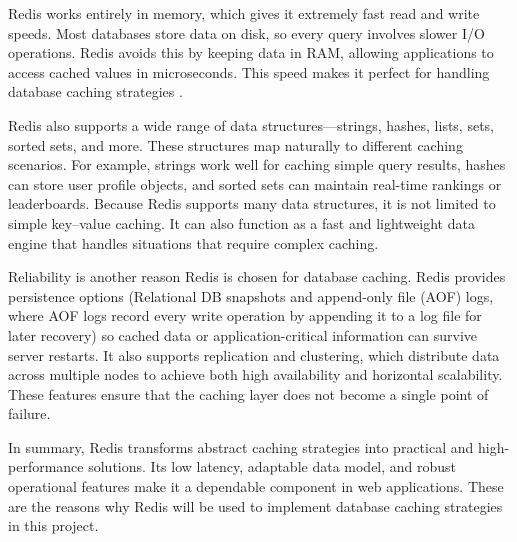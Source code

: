 Redis works entirely in memory, which gives it extremely fast read and write speeds.
Most databases store data on disk, so every query involves slower I/O operations.
Redis avoids this by keeping data in RAM, allowing applications to access cached values in microseconds.
This speed makes it perfect for handling database caching strategies \cite{Carlson_2013}.

Redis also supports a wide range of data structures—strings, hashes, lists, sets, sorted sets, and more.
These structures map naturally to different caching scenarios. For example, strings work well for caching simple query results,
hashes can store user profile objects, and sorted sets can maintain real-time rankings or leaderboards.
Because Redis supports many data structures, it is not limited to simple key–value caching.
It can also function as a fast and lightweight data engine that handles situations that require complex caching.

Reliability is another reason Redis is chosen for database caching. Redis provides persistence options (Relational DB snapshots and append-only file (AOF) logs, 
where AOF logs record every write operation by appending it to a log file for later recovery)
so cached data or application-critical information can survive server restarts. It also supports replication and clustering,
which distribute data across multiple nodes to achieve both high availability and horizontal scalability.
These features ensure that the caching layer does not become a single point of failure.

In summary, Redis transforms abstract caching strategies into practical and high-performance solutions.
Its low latency, adaptable data model, and robust operational features make it a dependable component in web applications.
These are the reasons why Redis will be used to implement database caching strategies in this project.